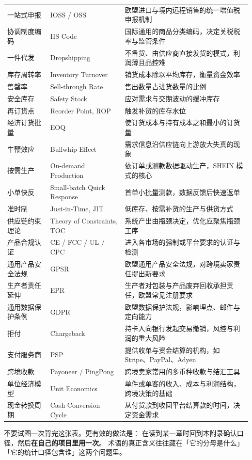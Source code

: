 \begin{xltabular}{\textwidth}{L{3.0cm} L{3.6cm} Y}
一站式申报 & IOSS / OSS & 欧盟进口与境内远程销售的统一增值税申报机制 \\
协调制度编码 & HS Code & 国际通用的商品分类编码，决定关税税率与监管条件 \\
一件代发 & Dropshipping & 不备货、由供应商直接发货的模式，利润薄且品控难 \\
库存周转率 & Inventory Turnover & 销货成本除以平均库存，衡量资金效率 \\
售罄率 & Sell-through Rate & 售出数量占进货数量的比例 \\
安全库存 & Safety Stock & 应对需求与交期波动的缓冲库存 \\
再订货点 & Reorder Point, ROP & 触发补货的库存水位 \\
经济订货批量 & EOQ & 使订货成本与持有成本之和最小的订货量 \\
牛鞭效应 & Bullwhip Effect & 需求信息沿供应链向上游放大失真的现象 \\
按需生产 & On-demand Production & 依订单或测款数据驱动生产，SHEIN 模式的核心 \\
小单快反 & Small-batch Quick Response & 首单小批量测款，数据反馈后快速返单 \\
准时制 & Just-in-Time, JIT & 低库存、按需补货的生产与供货方式 \\
供应链约束理论 & Theory of Constraints, TOC & 系统产出由瓶颈决定，优化应聚焦瓶颈工序 \\
产品合规认证 & CE / FCC / UL / CPC & 进入各市场的强制或平台要求的认证与检测 \\
通用产品安全法规 & GPSR & 欧盟通用产品安全法规，对跨境卖家责任提出新要求 \\
生产者责任延伸 & EPR & 生产者对包装与产品废弃回收承担责任，欧盟常见注册要求 \\
通用数据保护条例 & GDPR & 欧盟数据保护法规，影响埋点、邮件与定向能力 \\
拒付 & Chargeback & 持卡人向银行发起交易撤销，风控与利润的重大风险 \\
支付服务商 & PSP & 提供收单与资金结算的机构，如 Stripe、PayPal、Adyen \\
跨境收款 & Payoneer / PingPong & 跨境卖家常用的多币种收款与结汇工具 \\
单位经济模型 & Unit Economics & 单件或单客的收入、成本与利润结构，跨境决策的基础 \\
现金转换周期 & Cash Conversion Cycle & 从付货款到收回平台结算款的时间，决定资金需求 \\
\end{xltabular}

\begin{keypoint}[术语学习的建议]
不要试图一次背完这张表。更有效的做法是：
在读到某一章时回到本附录确认口径，然后\textbf{在自己的项目里用一次}。
术语的真正含义往往藏在「它的分母是什么」「它的统计口径包含谁」这两个问题里。
\end{keypoint}
